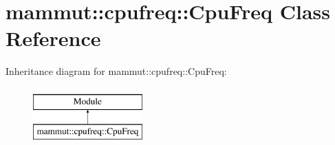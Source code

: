 \hypertarget{classmammut_1_1cpufreq_1_1CpuFreq}{\section{mammut\-:\-:cpufreq\-:\-:Cpu\-Freq Class Reference}
\label{classmammut_1_1cpufreq_1_1CpuFreq}
}
Inheritance diagram for mammut\-:\-:cpufreq\-:\-:Cpu\-Freq\-:\begin{figure}[H]
\begin{center}
\leavevmode
\includegraphics[height=2.000000cm]{classmammut_1_1cpufreq_1_1CpuFreq}
\end{center}
\end{figure}

